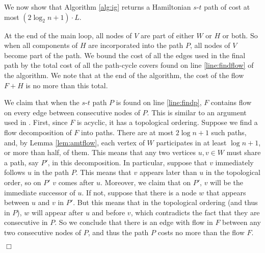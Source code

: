 \documentclass[11pt]{article}
\newcommand{\qed}{\hspace*{\fill}$\Box$}
\newenvironment{proofof}[1]{\medskip \noindent {\bf{Proof of #1. }}}{\qed}
\begin{document}
\medskip



We now show that Algorithm \ref{alg:ig} returns a Hamiltonian $s$-$t$ path of cost at most $(2\log_2 n +1)\cdot L$.



\begin{proofof}{Theorem \ref{thm:ig}}
At the end of the main loop, all nodes of $V$ are part of either $W$ or $H$ or both. So when 
all components of $H$ are incorporated into the path $P$, all nodes of $V$ become part of the path. 
We bound the cost of all the edges used in the final path by the total cost of all the path-cycle covers found on 
line \ref{line:findflow} of the algorithm. We note that at the end of the algorithm, the cost of 
the flow $F+H$ is no more than this total.

We claim that when the $s$-$t$ path $P$ is found on line \ref{line:findp},  $F$ contains flow on 
every edge between consecutive nodes of $P$. 
This is similar to an argument used in \cite{nagarajan:ravi:latency}.
First, since $F$ is acyclic, it has a topological ordering. Suppose we find a flow decomposition of $F$ into paths. There are at most $2\log n +1$ 
such paths, and, by Lemma \ref{lem:amtflow}, each vertex of $W$ participates in at least 
$\log n +1$, or more than half, of them.  This means that any two vertices $u,v\in W$ must 
share a path, say $P'$, in this decomposition. In particular, suppose that $v$ immediately 
follows $u$ in the path $P$. This means that $v$ appears later than $u$ in the topological 
order, so on $P'$ $v$ comes after $u$. Moreover, we claim that on $P'$, $v$ will be the immediate 
successor of $u$. If not, suppose that there is a node $w$ that appears between $u$ and $v$ in $P'$. 
But this means that in the topological ordering (and thus in $P$), $w$ will appear after $u$ and 
before $v$, which contradicts the fact that they are consecutive in $P$. So we conclude that there 
is an edge with flow in $F$ between any two consecutive nodes of $P$, and thus the path $P$ costs 
no more than the flow $F$. 


\end{proofof}
\end{document}
